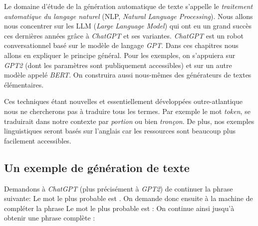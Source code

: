 \documentclass[11pt,class=report,crop=false]{standalone}
\begin{document}
Le domaine d'étude de la génération automatique de texte s'appelle le \emph{traitement automatique du langage naturel} (NLP, \emph{Natural Language Processing}).
Nous allons nous concentrer sur les LLM (\emph{Large Language Model}) 
qui ont eu un grand succès ces dernières années grâce à \emph{ChatGPT} et ses variantes.
\emph{ChatGPT} est un robot conversationnel basé sur le modèle de langage \emph{GPT}. Dans ces chapitres nous allons en expliquer le principe général. Pour les exemples, on s’appuiera sur \emph{GPT2} (dont les paramètres sont publiquement accessibles) et sur un autre modèle appelé \emph{BERT}. On construira aussi nous-mêmes des générateurs de textes élémentaires.

	
Ces techniques étant nouvelles et essentiellement développées outre-atlantique nous ne chercherons pas à traduire tous les termes. Par exemple le mot \emph{token}, se traduirait dans notre contexte par \emph{portion} ou bien \emph{tronçon}. De plus, nos exemples linguistiques seront basés sur l'anglais car les ressources sont beaucoup plus facilement accessibles.



\subsection{Un exemple de génération de texte}

Demandons à \emph{ChatGPT} (plus précisément à \emph{GPT2}) de continuer la phrase suivante:
Le mot le plus probable est \og{}\fg. On demande donc ensuite à la machine de compléter la phrase 
Le mot le plus probable est \og{}\fg{} :
On continue ainsi jusqu'à obtenir une phrase complète :
\end{document}

